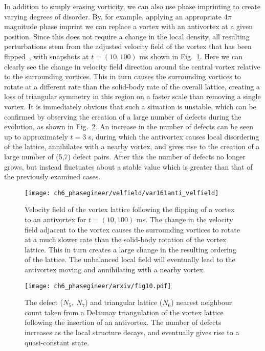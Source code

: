 In addition to simply erasing vorticity, we can also use phase imprinting to create varying degrees of disorder. By, for example, applying an appropriate $4\pi$ magnitude phase imprint we can replace a vortex with an antivortex at a given position. Since this does not require a change in the local density, all resulting perturbations stem from the adjusted velocity field of the vortex that has been flipped~\cite{VTX:Madarassy_gfd_2009}, with snapshots at $t=(10,100)$ ms shown in Fig.~\ref{fig:varr161anti_velfield}. Here we can clearly see the change in velocity field direction around the central vortex relative to the surrounding vortices. This in turn causes the surrounding vortices to rotate at a different rate than the solid-body rate of the overall lattice, creating a loss of triangular symmetry in this region on a faster scale than removing a single vortex. It is immediately obvious that such a situation is unstable, which can be confirmed by observing the creation of a large number of defects during the evolution, as shown in Fig.~\ref{fig:varr161anti_defect}. An increase in the number of defects can be seen up to approximately $t=3$ s, during which the antivortex causes local disordering of the lattice, annihilates with a nearby vortex, and gives rise to the creation of a large number of (5,7) defect pairs. After this the number of defects no longer grows, but instead fluctuates about a stable value which is greater than that of the previously examined cases.

\begin{figure}\centering
    \texttt{[image: ch6\_phasegineer/velfield/var161anti\_velfield]}
    \caption{Velocity field of the vortex lattice following the flipping of a vortex to an antivortex for $t=(10,100)$ ms. The change in the velocity field adjacent to the vortex causes the surrounding vortices to rotate at a much slower rate than the solid-body rotation of the vortex lattice. This in turn creates a large change in the resulting ordering of the lattice. The unbalanced local field will eventually lead to the antivortex moving and annihilating with a nearby vortex.}
    \label{fig:varr161anti_velfield}
\end{figure}


\begin{figure}\centering
    \texttt{[image: ch6\_phasegineer/arxiv/fig10.pdf]}
    \caption{The defect ($N_5,~N_7$) and triangular lattice ($N_6$) nearest neighbour count taken from a Delaunay triangulation of the vortex lattice following the insertion of an antivortex. The number of defects increases as the local structure decays, and eventually gives rise to a quasi-constant state.}\label{fig:varr161anti_defect}
\end{figure}

